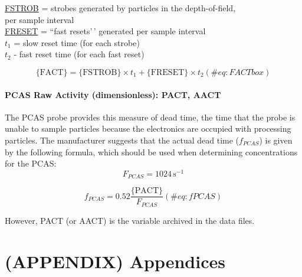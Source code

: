 \documentclass[
  english,
]{book}
\begin{document}
\protect\hyperlink{fstrob}{FSTROB} = strobes generated by particles in
the depth-of-field,\\
\hspace*{0.333em}\hspace*{0.333em}\hspace*{0.333em}\hspace*{0.333em}\hspace*{0.333em}\hspace*{0.333em}\hspace*{0.333em}\hspace*{0.333em}\hspace*{0.333em}\hspace*{0.333em}per
sample interval\\
\protect\hyperlink{freset}{FRESET} = ``fast resets'\,' generated per
sample interval\\
\(t_{1}\) = slow reset time (for each strobe)\\
\(t_{2}\) - fast reset time (for each fast reset)

\begin{equation}
\mathrm{\{FACT\}=\{FSTROB\}}\times t_{1}+\mathrm{\{FRESET\}}\times t_{2}
(\#eq:FACTbox)
\end{equation}

\hypertarget{AACT}{%
\subsubsection*{PCAS Raw Activity (dimensionless): PACT,
AACT}\label{AACT}}

The PCAS probe provides this measure of dead time, the time that the
probe is unable to sample particles because the electronics are occupied
with processing particles. The manufacturer suggests that the actual
dead time (\(f_{PCAS}\)) is given by the following formula, which should
be used when determining concentrations for the PCAS:\\

\[F_{PCAS} = 1024\,\mathrm{s}^{-1}\]

\begin{equation}
f_{PCAS} = 0.52\frac{\mathrm{\{PACT\}}}{F_{PCAS}}
(\#eq:fPCAS)
\end{equation}

However, PACT (or AACT) is the variable archived in the data files.

\hypertarget{appendix-appendices}{%
\chapter*{(APPENDIX) Appendices}\label{appendix-appendices}}
\end{document}

